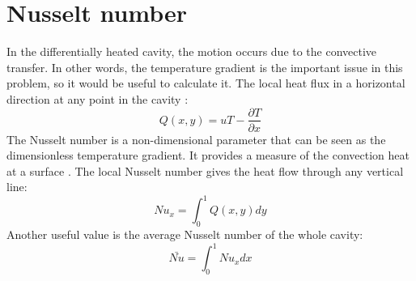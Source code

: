 \section{Nusselt number}
In the differentially heated cavity, the motion occurs due to the convective transfer. In other words, the temperature gradient is the important issue in this problem, so it would be useful to calculate it. The local heat flux in a horizontal direction at any point in the cavity \cite{DeVahlDavis1983}:
\begin{equation}
Q\left(x, y\right)=uT-\frac{\partial T}{\partial x}
\end{equation}
The Nusselt number is a non-dimensional parameter that can be seen as the dimensionless temperature gradient. It provides a measure of the convection heat at a surface \cite{Bergman2011}. The local Nusselt number gives the heat flow through any vertical line:
\begin{equation}
	Nu_{x}=\int_{0}^{1}Q\left(x, y\right)dy
\end{equation}
Another useful value is the average Nusselt number of the whole cavity:
\begin{equation}
\bar{Nu}=\int_{0}^{1}Nu_{x}dx
\end{equation}

